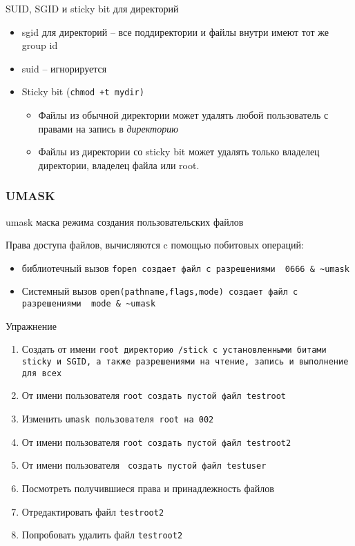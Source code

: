 \begin{frame}{SUID, SGID и sticky bit для директорий}
	\begin{itemize}
		\item sgid для директорий -- все поддиректории и файлы внутри имеют тот же group id
		\item suid -- игнорируется
		\item Sticky bit (\tt{chmod +t mydir})
          \begin{itemize}
            \item Файлы из обычной директории может удалять любой пользователь с правами на запись в \emph{директорию}
            \item Файлы из директории со sticky bit может удалять только владелец директории, владелец файла или root.
          \end{itemize} 
	\end{itemize}
\end{frame}

\begin{frame}[fragile]
 \frametitle{UMASK}

	\begin{block}{umask}
		маска режима создания пользовательских файлов
	\end{block}

	Права доступа файлов, вычисляются c помощью побитовых операций:
    \begin{itemize}
      \item библиотечный вызов \tt{fopen} создает файл с разрешениями 
     \verb+ 0666 & ~umask +
      \item Системный вызов \tt{open(pathname,flags,mode)} создает файл с разрешениями \verb+ mode & ~umask +
   \end{itemize}
        

\end{frame}

\begin{frame}
	\begin{block}{Упражнение}
		\begin{enumerate}
			\item Создать от имени \tt{root} директорию \tt{/stick} с установленными битами \tt{sticky} и \tt{SGID}, а также разрешениями на чтение, запись и выполнение для всех
			\item От имени пользователя \tt{root} создать пустой файл \tt{testroot}
			\item Изменить \tt{umask} пользователя \tt{root} на 002
			\item От имени пользователя \tt{root} создать пустой файл \tt{testroot2}
			\item От имени пользователя \tt{} создать пустой файл \tt{testuser}
			\item Посмотреть получившиеся права и принадлежность файлов
			\item Отредактировать файл \tt{testroot2}
			\item Попробовать удалить файл \tt{testroot2}
		\end{enumerate}
	\end{block}
\end{frame}




